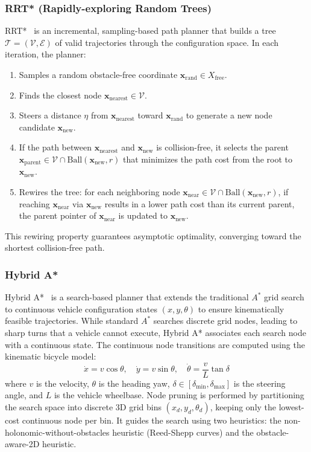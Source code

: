 \documentclass[11pt,a4paper]{report}
\begin{document}
\subsubsection{RRT* (Rapidly-exploring Random Trees)}
RRT*~\cite{rrt_star} is an incremental, sampling-based path planner that builds a tree $\mathcal{T} = (\mathcal{V}, \mathcal{E})$ of valid trajectories through the configuration space. 
In each iteration, the planner:
\begin{enumerate}
    \item Samples a random obstacle-free coordinate $\mathbf{x}_{\text{rand}} \in X_{\text{free}}$.
    \item Finds the closest node $\mathbf{x}_{\text{nearest}} \in \mathcal{V}$.
    \item Steers a distance $\eta$ from $\mathbf{x}_{\text{nearest}}$ toward $\mathbf{x}_{\text{rand}}$ to generate a new node candidate $\mathbf{x}_{\text{new}}$.
    \item If the path between $\mathbf{x}_{\text{nearest}}$ and $\mathbf{x}_{\text{new}}$ is collision-free, it selects the parent $\mathbf{x}_{\text{parent}} \in \mathcal{V} \cap \text{Ball}(\mathbf{x}_{\text{new}}, r)$ that minimizes the path cost from the root to $\mathbf{x}_{\text{new}}$.
    \item Rewires the tree: for each neighboring node $\mathbf{x}_{\text{near}} \in \mathcal{V} \cap \text{Ball}(\mathbf{x}_{\text{new}}, r)$, if reaching $\mathbf{x}_{\text{near}}$ via $\mathbf{x}_{\text{new}}$ results in a lower path cost than its current parent, the parent pointer of $\mathbf{x}_{\text{near}}$ is updated to $\mathbf{x}_{\text{new}}$.
\end{enumerate}
This rewiring property guarantees asymptotic optimality, converging toward the shortest collision-free path.

\subsubsection{Hybrid A*}
Hybrid A*~\cite{hybrid_a_star} is a search-based planner that extends the traditional $A^*$ grid search to continuous vehicle configuration states $(x, y, \theta)$ to ensure kinematically feasible trajectories. 
While standard $A^*$ searches discrete grid nodes, leading to sharp turns that a vehicle cannot execute, Hybrid A* associates each search node with a continuous state. The continuous node transitions are computed using the kinematic bicycle model:
\begin{equation}
    \dot{x} = v \cos\theta, \quad \dot{y} = v \sin\theta, \quad \dot{\theta} = \frac{v}{L} \tan\delta
\end{equation}
where $v$ is the velocity, $\theta$ is the heading yaw, $\delta \in [\delta_{\text{min}}, \delta_{\text{max}}]$ is the steering angle, and $L$ is the vehicle wheelbase. Node pruning is performed by partitioning the search space into discrete 3D grid bins $(x_d, y_d, \theta_d)$, keeping only the lowest-cost continuous node per bin. It guides the search using two heuristics: the non-holonomic-without-obstacles heuristic (Reed-Shepp curves) and the obstacle-aware-2D heuristic.
\end{document}
